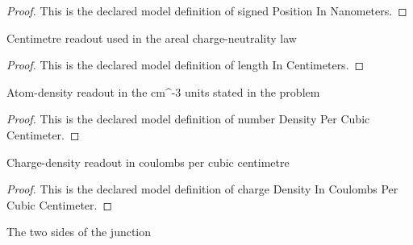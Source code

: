 \begin{proof}
  This is the declared model definition of signed Position In Nanometers.
\end{proof}
\begin{definition}
  \label{def:physics:phyx-mini-0630:phyxminiproblems-problemphyxmini0630-lengthincentimeters}
  Centimetre readout used in the areal charge-neutrality law
\end{definition}
\begin{proof}
  This is the declared model definition of length In Centimeters.
\end{proof}
\begin{definition}
  \label{def:physics:phyx-mini-0630:phyxminiproblems-problemphyxmini0630-numberdensitypercubiccentimeter}
  Atom-density readout in the cm\textasciicircum{}-3 units stated in the problem
\end{definition}
\begin{proof}
  This is the declared model definition of number Density Per Cubic Centimeter.
\end{proof}
\begin{definition}
  \label{def:physics:phyx-mini-0630:phyxminiproblems-problemphyxmini0630-chargedensityincoulombspercubiccentimeter}
  Charge-density readout in coulombs per cubic centimetre
\end{definition}
\begin{proof}
  This is the declared model definition of charge Density In Coulombs Per Cubic Centimeter.
\end{proof}
\begin{definition}
  \label{def:physics:phyx-mini-0630:phyxminiproblems-problemphyxmini0630-semiconductorside}
  The two sides of the junction
\end{definition}
